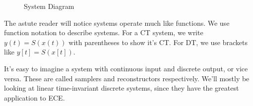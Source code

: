 \begin{figure}[h]
    \centering
    \caption{System Diagram}
    \label{System diagram}
\end{figure}

The astute reader will notice systems operate much like functions.
We use function notation to describe systems. For a CT system, we
write $y(t) = S(x(t))$ with parentheses to show it's CT. For DT,
we use brackets like $y[t] = S(x[t])$.

It's easy to imagine a system with continuous input and discrete output,
or vice versa. These are called samplers and reconstructors respectively.
We'll mostly be looking at linear time-invariant discrete systems, since they have the greatest
application to ECE.